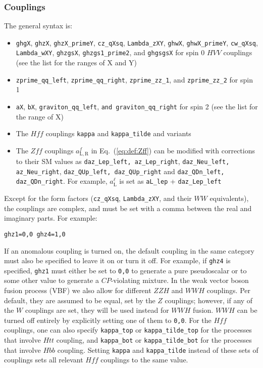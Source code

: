 \documentclass[aps,superscriptaddress,nofootinbib]{revtex4}
\begin{document}
\begin{itemize}
\subsubsection{Couplings}
The general syntax is:
\begin{itemize}
\item \verb|ghgX|, \verb|ghzX|, \verb|ghzX_primeY|, \verb|cz_qXsq|, \verb|Lambda_zXY|, \verb|ghwX|, \verb|ghwX_primeY|, \verb|cw_qXsq|, \verb|Lambda_wXY|, \verb|ghzgsX|, \verb|ghzgs1_prime2|, and \verb|ghgsgsX| for spin 0 $HVV$ couplings (see the list for the ranges of X and Y)
\item \verb|zprime_qq_left|, \verb|zprime_qq_right|, \verb|zprime_zz_1|, and \verb|zprime_zz_2| for spin 1
\item \verb|aX|, \verb|bX|, \verb|graviton_qq_left|, \verb|and graviton_qq_right| for spin 2 (see the list for the range of X)
\item The $Hff$ couplings \verb|kappa| and \verb|kappa_tilde| and variants
\item The $Zff$ couplings $a^f_\mathrm{L,R}$ in Eq.~(\ref{eq:def:Zff}) can be modified with corrections to their SM values as \verb|daz_Lep_left, az_Lep_right|, \verb|daz_Neu_left, az_Neu_right|, \verb|daz_QUp_left, daz_QUp_right| and \verb|daz_QDn_left, daz_QDn_right|.
For example,  $a^\ell_\mathrm{L}$ is set as \verb|aL_lep| +  \verb|daz_Lep_left|
\end{itemize}
Except for the form factors (\verb|cz_qXsq|, \verb|Lambda_zXY|, and their $WW$ equivalents), the couplings are complex, and must be set with a comma between the real and imaginary parts.  For example:
\begin{verbatim}
ghz1=0,0 ghz4=1,0
\end{verbatim}
If an anomalous coupling is turned on, the default coupling in the same category must also be specified to leave it on or turn it off.  For example, if \verb|ghz4| is specified, \verb|ghz1| must either be set to \verb|0,0| to generate a pure pseudoscalar or to some other value to generate a $CP$-violating mixture.
In the weak vector boson fusion process (VBF) we also allow for different $ZZH$ and $WWH$ couplings.  Per default, they are assumed to be equal, set by the $Z$ couplings; however, if any of the $W$ couplings are set, they will be used instead for $WWH$ fusion.  $WWH$ can be turned off entirely by explicitly setting one of them to \verb|0,0|.
For the $Hff$ couplings, one can also specify \verb|kappa_top| or \verb|kappa_tilde_top| for the processes that involve $Htt$ coupling, and \verb|kappa_bot| or \verb|kappa_tilde_bot| for the processes that involve $Hbb$ coupling. Setting \verb|kappa| and \verb|kappa_tilde| instead of these sets of couplings sets all relevant $Hff$ couplings to the same value.
\end{itemize}
\end{document}
